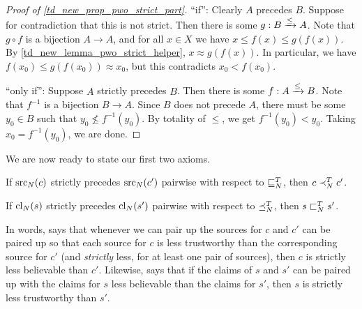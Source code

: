 \begin{proof}[Proof of \cref{td_new_prop_pwo_strict_part}]
    ``if'': Clearly $A$ precedes $B$. Suppose for contradiction that this is not
    strict. Then there is some ${g}:{B} \xrightarrow{\le} {A}$. Note that $g \circ f$
    is a bijection $A \to A$, and for all $x \in X$ we have $x \le f(x) \le
    g(f(x))$. By \cref{td_new_lemma_pwo_strict_helper}, $x \approx g(f(x))$. In
    particular, we have $f(x_0) \le g(f(x_0)) \approx x_0$, but this
    contradicts $x_0 < f(x_0)$.

    ``only if'': Suppose $A$ strictly precedes $B$. Then there is some
    ${f}:{A} \xrightarrow{\le} {B}$. Note that $f^{-1}$ is a bijection $B \to A$.
    Since $B$ does not precede $A$, there must be some $y_0 \in B$ such that
    $y_0 \not\le f^{-1}(y_0)$. By totality of $\le$, we get $f^{-1}(y_0) <
    y_0$. Taking $x_0 = f^{-1}(y_0)$, we are done.
\end{proof}

We are now ready to state our first two axioms.

\begin{axiomlist}
\begin{axiom}[\claimcoherence{}]
    If $\operatorname{src}_N(c)$ strictly precedes $\operatorname{src}_N(c')$ pairwise with respect to
    $\sqsubseteq_N^T$, then $c \prec_N^T c'$.
\end{axiom}
\begin{axiom}[\sourcecoherence{}]
    If $\operatorname{cl}_N(s)$ strictly precedes $\operatorname{cl}_N(s')$ pairwise with respect to
    $\preceq_N^T$, then $s \sqsubset_N^T s'$.
\end{axiom}
\end{axiomlist}

In words, \claimcoherence{} says that whenever we can pair up the sources for
$c$ and $c'$ can be paired up so that each source for $c$ is less trustworthy
than the corresponding source for $c'$ (and \emph{strictly} less, for at least
one pair of sources), then $c$ is strictly less believable than $c'$. Likewise,
\sourcecoherence{} says that if the claims of $s$ and $s'$ can be paired up
with the claims for $s$ less believable than the claims for $s'$, then $s$ is
strictly less trustworthy than $s'$.

